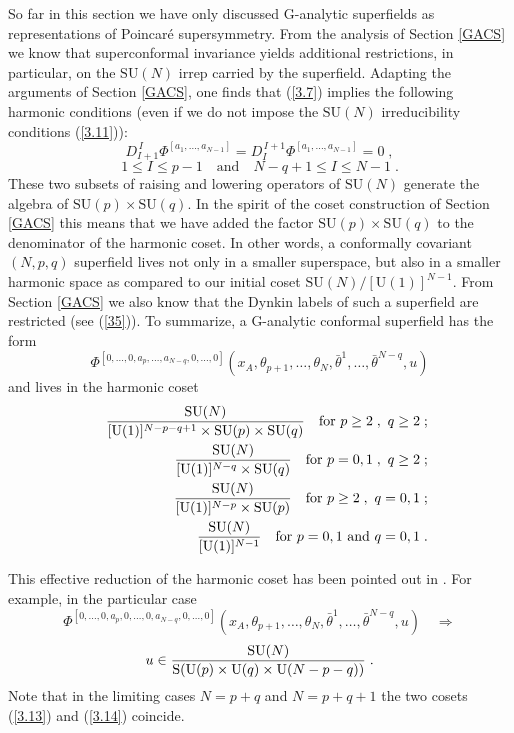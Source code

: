 \documentclass[a4paper,12pt]{article}
\begin{document}
So far in this section we have only discussed G-analytic 
superfields as representations of Poincar\'{e} supersymmetry. From the 
analysis of Section \ref{GACS} we know that superconformal 
invariance yields additional restrictions, in particular, on the 
$\mbox{SU}(N)$ irrep carried by the superfield. Adapting the 
arguments of Section \ref{GACS}, one finds that (\ref{3.7}) 
implies the following harmonic conditions (even if we do not 
impose the $\mbox{SU}(N)$ irreducibility conditions (\ref{3.11})): 
$$
D^{\,I}_{I+1}\Phi^{[a_1,\ldots,a_{N-1}]} =  
D^{\,I+1}_{I}\Phi^{[a_1,\ldots,a_{N-1}]} = 0\;, 
$$
\begin{equation}\label{3.12}
1\leq I \leq p-1 \quad \mbox{and} \quad N-q+1\leq I \leq N-1\;. 
\end{equation}
These two subsets of raising and lowering operators of 
$\mbox{SU}(N)$ generate the algebra of $\mbox{SU}(p)\times 
\mbox{SU}(q)$. In the spirit of the coset construction of Section 
\ref{GACS} this means that we have added the factor 
$\mbox{SU}(p)\times \mbox{SU}(q)$ to the denominator of the 
harmonic coset. In other words, a conformally covariant $(N,p,q)$ 
superfield lives not only in a smaller superspace, but also in a 
smaller harmonic space as compared to our initial coset 
$\mbox{SU}(N)/[\mbox{U}(1)]^{N-1}$. From Section \ref{GACS} we 
also know that the Dynkin labels of such a superfield are 
restricted (see (\ref{35})). To summarize, a G-analytic conformal 
superfield has the form 
\begin{equation}\label{3.13'}
\Phi^{[0,\ldots,0,a_p,\ldots,a_{N-q},0,\ldots,0]} 
(x_A,\theta_{p+1},\ldots,\theta_{N}, 
\bar\theta^1,\ldots,\bar\theta^{N-q}, u) 
\end{equation}
and lives in the harmonic coset  
\begin{eqnarray}
  &&{\mbox{SU}(N)\over [\mbox{U}(1)]^{N-p-q+1}\times \mbox{SU}(p)\times 
\mbox{SU}(q)}   \quad \mbox{for}\ p\geq2\;, \ q\geq2\;; 
\nonumber\\ 
  &&{\mbox{SU}(N)\over [\mbox{U}(1)]^{N-q}\times 
\mbox{SU}(q)}   \quad \mbox{for}\ p=0,1\;, \ q\geq2\;; 
\label{3.13}\\ 
  &&{\mbox{SU}(N)\over [\mbox{U}(1)]^{N-p}\times 
\mbox{SU}(p)}   \quad \mbox{for}\ p\geq2\;, \ q=0,1\;; \nonumber\\ 
  &&{\mbox{SU}(N)\over 
[\mbox{U}(1)]^{N-1}}   \quad \mbox{for}\ p=0,1\ \mbox{and} \ 
q=0,1\;. \nonumber
\end{eqnarray}

This effective reduction of the harmonic coset has been pointed 
out in \cite{HL,hh}. For example, in the particular case 
$$
\Phi^{[0,\ldots,0,a_p,0,\ldots,0,a_{N-q},0,\ldots,0]} 
(x_A,\theta_{p+1},\ldots,\theta_{N}, 
\bar\theta^1,\ldots,\bar\theta^{N-q}, u)\quad \Rightarrow 
$$
\begin{equation}\label{3.14}
u\in {\mbox{SU}(N)\over \mbox{S}(\mbox{U}(p)\times 
\mbox{U}(q)\times \mbox{U}(N-p-q))}\;.   
\end{equation}
Note that in the limiting cases $N=p+q$ and $N=p+q+1$ the two 
cosets (\ref{3.13}) and (\ref{3.14}) coincide. 
\end{document}
